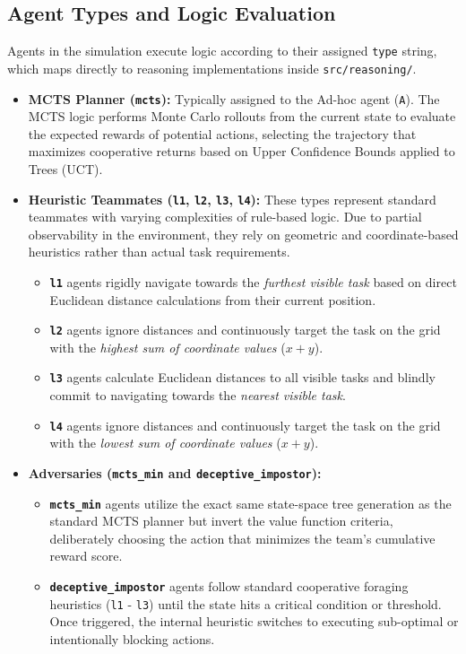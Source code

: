 \documentclass[11pt]{article}
\begin{document}
\subsection{Agent Types and Logic Evaluation}
Agents in the simulation execute logic according to their assigned \texttt{type} string, which maps directly to reasoning implementations inside \texttt{src/reasoning/}.

\begin{itemize}
    \item \textbf{MCTS Planner (\texttt{mcts}):} Typically assigned to the Ad-hoc agent (\texttt{A}). The MCTS logic performs Monte Carlo rollouts from the current state to evaluate the expected rewards of potential actions, selecting the trajectory that maximizes cooperative returns based on Upper Confidence Bounds applied to Trees (UCT).
    \item \textbf{Heuristic Teammates (\texttt{l1}, \texttt{l2}, \texttt{l3}, \texttt{l4}):} These types represent standard teammates with varying complexities of rule-based logic. Due to partial observability in the environment, they rely on geometric and coordinate-based heuristics rather than actual task requirements.
    \begin{itemize}
        \item \textbf{\texttt{l1}} agents rigidly navigate towards the \textit{furthest visible task} based on direct Euclidean distance calculations from their current position.
        \item \textbf{\texttt{l2}} agents ignore distances and continuously target the task on the grid with the \textit{highest sum of coordinate values} ($x + y$).
        \item \textbf{\texttt{l3}} agents calculate Euclidean distances to all visible tasks and blindly commit to navigating towards the \textit{nearest visible task}.
        \item \textbf{\texttt{l4}} agents ignore distances and continuously target the task on the grid with the \textit{lowest sum of coordinate values} ($x + y$).
    \end{itemize}
    \item \textbf{Adversaries (\texttt{mcts\_min} and \texttt{deceptive\_impostor}):} 
    \begin{itemize}
        \item \textbf{\texttt{mcts\_min}} agents utilize the exact same state-space tree generation as the standard MCTS planner but invert the value function criteria, deliberately choosing the action that minimizes the team's cumulative reward score.
        \item \textbf{\texttt{deceptive\_impostor}} agents follow standard cooperative foraging heuristics (\texttt{l1} - \texttt{l3}) until the state hits a critical condition or threshold. Once triggered, the internal heuristic switches to executing sub-optimal or intentionally blocking actions.
    \end{itemize}
\end{itemize}
\end{document}
